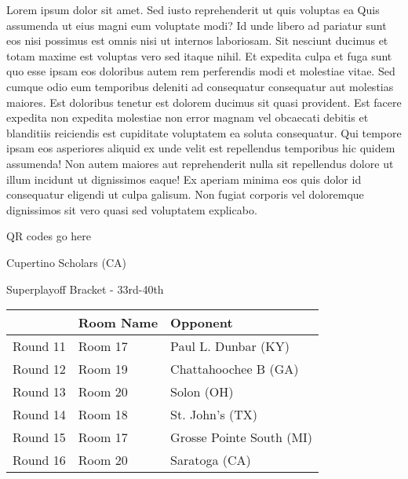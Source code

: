 \documentclass{article}%
\begin{document}
\vspace*{8pt}%
\linebreak%
\newline%
\newline%
    Lorem ipsum dolor sit amet. Sed iusto reprehenderit ut quis voluptas ea Quis assumenda ut eius magni eum voluptate modi? Id unde libero ad pariatur sunt eos nisi possimus est omnis nisi ut internos laboriosam. Sit nesciunt ducimus et totam maxime est voluptas vero sed itaque nihil. Et expedita culpa et fuga sunt quo esse ipsam eos doloribus autem rem perferendis modi et molestiae vitae.\newline%
\newline%
    Sed cumque odio eum temporibus deleniti ad consequatur consequatur aut molestias maiores. Est doloribus tenetur est dolorem ducimus sit quasi provident. Est facere expedita non expedita molestiae non error magnam vel obcaecati debitis et blanditiis reiciendis est cupiditate voluptatem ea soluta consequatur. Qui tempore ipsam eos asperiores aliquid ex unde velit est repellendus temporibus hic quidem assumenda!\newline%
\newline%
    Non autem maiores aut reprehenderit nulla sit repellendus dolore ut illum incidunt ut dignissimos eaque! Ex aperiam minima eos quis dolor id consequatur eligendi ut culpa galisum. Non fugiat corporis vel doloremque dignissimos sit vero quasi sed voluptatem explicabo.\newline%
\newline%
\vspace*{30pt}%
\begin{center}%
\begin{Huge}%
QR codes go here%
\end{Huge}%
\end{center}%
\newpage%
\begin{center}%
\begin{Huge}%
Cupertino Scholars (CA)%
\end{Huge}%
\vspace*{8pt}%
\linebreak%
\begin{Large}%
Superplayoff Bracket {-} 33rd{-}40th%
\end{Large}%
\end{center}%
%
\begin{tabularx}{\textwidth}{|c|Y|Y|}%
\hline%
&Room Name&Opponent\\%
\hline%
Round 11&Room 17&Paul L. Dunbar (KY)\\%
Round 12&Room 19&Chattahoochee B (GA)\\%
Round 13&Room 20&Solon (OH)\\%
Round 14&Room 18&St. John's (TX)\\%
Round 15&Room 17&Grosse Pointe South (MI)\\%
Round 16&Room 20&Saratoga (CA)\\%
\hline%
\end{tabularx}%
\end{document}
